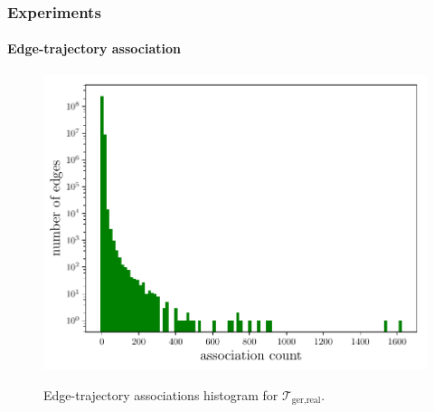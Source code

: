 \documentclass{beamer}
\newcommand{\traj}[2]{\mathcal{T}_{\text{#1},\text{#2}}}
\begin{document}
\begin{frame}
	\frametitle{Experiments}
	\framesubtitle{Edge-trajectory association}
	\begin{figure}
		\caption{Edge-trajectory associations histogram  for $\traj{ger}{real}$.}
		{\includegraphics[width=0.8\linewidth]{plots/osmGerHist.pdf} }
	\end{figure}
\end{frame}

\end{document}
